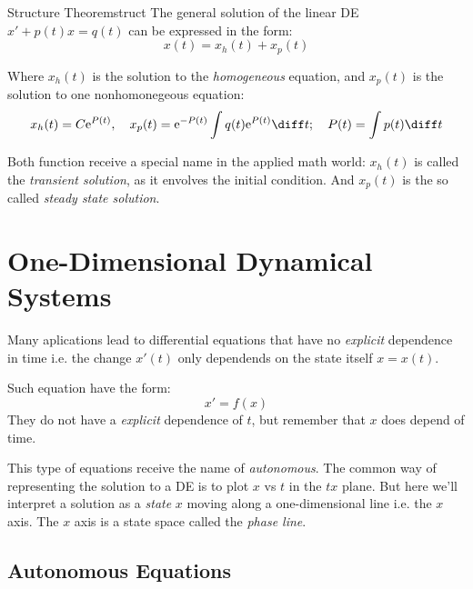 \documentclass[../ode.tex]{subfiles}
\begin{document}
    \begin{thm}{Structure Theorem}{struct}
        The general solution of the linear DE $x' + p(t)x = q(t)$ can be expressed in the form: 
        \begin{equation*}
            x(t) = x_{h}(t) + x_{p}(t)
        \end{equation*}
        
        Where $x_{h}(t)$ is the solution to the \emph{homogeneous} equation, and $x_{p}(t)$ is the solution to one nonhomonegeous
        equation:
        \begin{equation*}
            x_{h}(t) = C \mathrm{e}^{P(t)}, \quad x_{p}(t)=\mathrm{e}^{-P(t)} \int q(t) \mathrm{e}^{P(t)} \diff t ; \quad
            P(t)=\int p(t)\diff t
        \end{equation*}

        Both function receive a special name in the applied math world: $x_{h}(t)$ is called the \emph{transient solution}, as it
        envolves the initial condition. And $x_{p}(t)$ is the so called \emph{steady state solution}.
    \end{thm}

    
    \section{\sffamily One-Dimensional Dynamical Systems}
    Many aplications lead to differential equations that have no \emph{explicit} dependence in time i.e. the change $x'(t)$ only
    dependends on the state itself $x = x(t)$.
   
    Such equation have the form:
    \begin{equation*}
        x' = f(x) 
    \end{equation*}
    They do not have a \emph{explicit} dependence of $t$, but remember that $x$ does depend of time. 

    This type of equations receive the name of \emph{autonomous}. The common way of representing the solution to a DE is to plot
    $x$ vs $t$ in the $tx$ plane. But here we'll interpret a solution as a  \emph{state} $x$ moving along a one-dimensional line
    i.e. the $x$ axis. The $x$ axis is a state space called the \emph{phase line}.

    \subsection{\sffamily Autonomous Equations}
    
\end{document}
